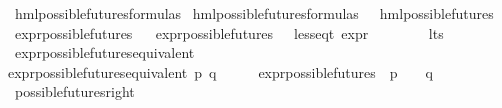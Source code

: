 \begin{isabellebody}
\isanewline
{}\isamarkupfalse%
\ hml{\isacharunderscore}{\kern0pt}possible{\isacharunderscore}{\kern0pt}futures{\isacharunderscore}{\kern0pt}formulas\ \isanewline
{\isachardoublequoteopen}hml{\isacharunderscore}{\kern0pt}possible{\isacharunderscore}{\kern0pt}futures{\isacharunderscore}{\kern0pt}formulas\ {\isasymequiv}\ {\isacharbraceleft}{\kern0pt}{\isasymphi}{\isachardot}{\kern0pt}\ hml{\isacharunderscore}{\kern0pt}possible{\isacharunderscore}{\kern0pt}futures\ {\isasymphi}{\isacharbraceright}{\kern0pt}{\isachardoublequoteclose}\isanewline
\isanewline
{}\isamarkupfalse%
\ expr{\isacharunderscore}{\kern0pt}possible{\isacharunderscore}{\kern0pt}futures\isanewline
\ \ \isanewline
{\isachardoublequoteopen}expr{\isacharunderscore}{\kern0pt}possible{\isacharunderscore}{\kern0pt}futures\ {\isacharequal}{\kern0pt}\ {\isacharbraceleft}{\kern0pt}{\isasymphi}{\isachardot}{\kern0pt}\ {\isacharparenleft}{\kern0pt}less{\isacharunderscore}{\kern0pt}eq{\isacharunderscore}{\kern0pt}t\ {\isacharparenleft}{\kern0pt}expr\ {\isasymphi}{\isacharparenright}{\kern0pt}\ {\isacharparenleft}{\kern0pt}{\isasyminfinity}{\isacharcomma}{\kern0pt}\ {}{\isacharcomma}{\kern0pt}\ {\isasyminfinity}{\isacharcomma}{\kern0pt}\ {\isasyminfinity}{\isacharcomma}{\kern0pt}\ {\isasyminfinity}{\isacharcomma}{\kern0pt}\ {}{\isacharparenright}{\kern0pt}{\isacharparenright}{\kern0pt}{\isacharbraceright}{\kern0pt}{\isachardoublequoteclose}\isanewline
\isanewline
{}\isamarkupfalse%
\ lts\isanewline
{}\isanewline
\isanewline
{}\isamarkupfalse%
\ expr{\isacharunderscore}{\kern0pt}possible{\isacharunderscore}{\kern0pt}futures{\isacharunderscore}{\kern0pt}equivalent\ \isanewline
\ \ \isanewline
{\isachardoublequoteopen}expr{\isacharunderscore}{\kern0pt}possible{\isacharunderscore}{\kern0pt}futures{\isacharunderscore}{\kern0pt}equivalent\ p\ q\ {\isasymequiv}\ {\isacharparenleft}{\kern0pt}{\isasymforall}\ {\isasymphi}{\isachardot}{\kern0pt}\ {\isasymphi}\ {\isasymin}\ expr{\isacharunderscore}{\kern0pt}possible{\isacharunderscore}{\kern0pt}futures\ {\isasymlongrightarrow}\ {\isacharparenleft}{\kern0pt}p\ {\isasymTurnstile}\ {\isasymphi}{\isacharparenright}{\kern0pt}\ {\isasymlongleftrightarrow}\ {\isacharparenleft}{\kern0pt}q\ {\isasymTurnstile}\ {\isasymphi}{\isacharparenright}{\kern0pt}{\isacharparenright}{\kern0pt}{\isachardoublequoteclose}\isanewline
{}\isamarkupfalse%
\isanewline
{}\isamarkupfalse%
\ possible{\isacharunderscore}{\kern0pt}futures{\isacharunderscore}{\kern0pt}right{\isacharcolon}{\kern0pt}\isanewline

\end{isabellebody}
